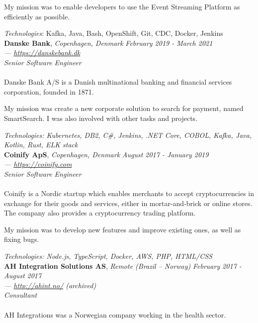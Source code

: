 \documentclass[margin]{res} %
\begin{document}
\begin{resume}
		My mission was to enable developers to use the Event Streaming Platform as efficiently as possible.

		{\sl Technologies}: Kafka, Java, Bash, OpenShift, Git, CDC, Docker, Jenkins\\

		{\bf Danske Bank}, {\sl Copenhagen, Denmark} \hfill {\sl February 2019 - March 2021} \\
		{\sl — \href{https://danskebank.dk}{https://danskebank.dk}} \\
		{\sl Senior Software Engineer} \\
		\\
		Danske Bank A/S is a Danish multinational banking and financial services corporation, founded in 1871.

		My mission was create a new corporate solution to search for payment, named SmartSearch. I was also involved with other tasks and projects.

		{\sl Technologies: Kubernetes, DB2, C\#, Jenkins, .NET Core, COBOL, Kafka, Java, Kotlin, Rust, ELK stack }  \\

		{\bf Coinify ApS}, {\sl Copenhagen, Denmark} \hfill {\sl August 2017 - January 2019} \\
		{\sl — \href{https://coinify.com}{https://coinify.com}} \\
		{\sl Senior Software Engineer} \\
		\\
		Coinify is a Nordic startup which enables merchants to accept cryptocurrencies in exchange for their goods and services, either in mortar-and-brick or online stores. The company also provides a cryptocurrency trading platform.

		My mission was to develop new features and improve existing ones, as well as fixing bugs.

		{\sl Technologies: Node.js, TypeScript, Docker, AWS, PHP, HTML/CSS } \\

		{\bf AH Integration Solutions AS}, {\sl Remote (Brazil -- Norway)} \hfill {\sl February 2017 - August 2017} \\
		{\sl — \href{https://web.archive.org/web/20160208120600/http://ahint.no/}{http://ahint.no/} (archived)} \\
		{\sl Consultant} \\
		\\
		AH Integrations was a Norwegian company working in the health sector.


\end{resume}
\end{document}
